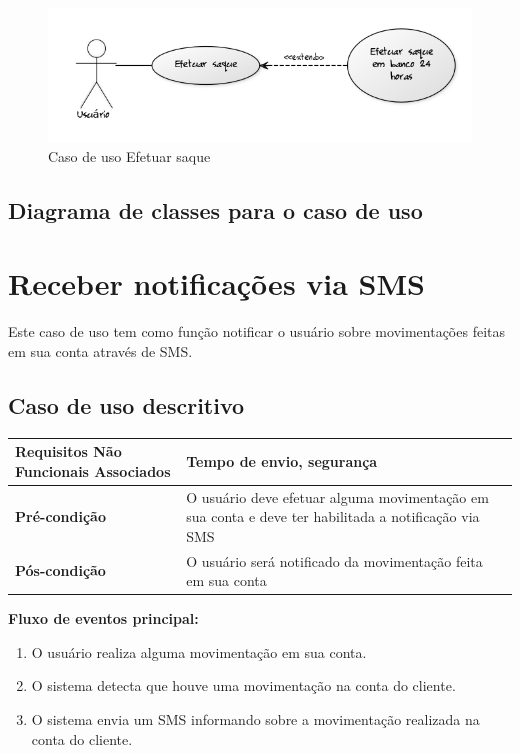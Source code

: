 \begin{figure}[!htb]
     \centering
     \includegraphics[scale=0.6]{diagramas/caso-de-uso/imagens/efetuarSaque.png}
     \caption{Caso de uso Efetuar saque}
\end{figure}

\subsection{Diagrama de classes para o caso de uso}

\section{Receber notificações via SMS}
\label{sec:ReceberSMS}

Este caso de uso tem como função notificar o usuário sobre movimentações feitas em sua conta através de SMS.

\subsection{Caso de uso descritivo}

\begin{table}[h]
  \centering
  \begin{tabular}{|p{4cm} | p{10cm} |}
      \hline
      \small{\textbf{Requisitos Não Funcionais Associados}}	& Tempo de envio, segurança	\\ \hline
      \small{\textbf{Pré-condição}}	&	O usuário deve efetuar alguma movimentação em sua conta e deve ter habilitada a notificação via SMS	\\ \hline
      \small{\textbf{Pós-condição}}	&	O usuário será notificado da movimentação feita em sua conta	\\ \hline
    \end{tabular}
\end{table}

\textbf{Fluxo de eventos principal:}

\begin{enumerate}
  \item O usuário realiza alguma movimentação em sua conta.
  \item O sistema detecta que houve uma movimentação na conta do cliente.
  \item O sistema envia um SMS informando sobre a movimentação realizada na conta do cliente.
\end{enumerate}

